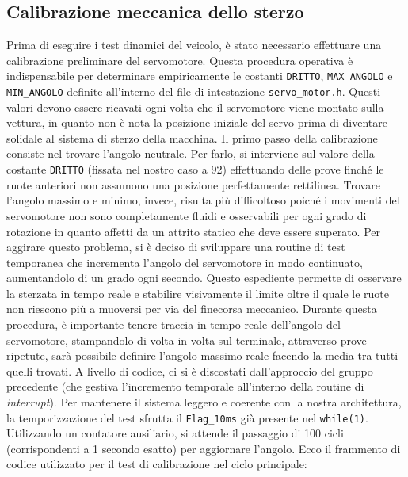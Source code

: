 \documentclass[11pt]{report}
\begin{document}
\subsection{Calibrazione meccanica dello sterzo}
Prima di eseguire i test dinamici del veicolo, è stato necessario effettuare una calibrazione preliminare del servomotore. Questa procedura operativa è indispensabile per determinare empiricamente le costanti \verb|DRITTO|, \verb|MAX_ANGOLO| e \verb|MIN_ANGOLO| definite all'interno del file di intestazione \verb|servo_motor.h|. Questi valori devono essere ricavati ogni volta che il servomotore viene montato sulla vettura, in quanto non è nota la posizione iniziale del servo prima di diventare solidale al sistema di sterzo della macchina. 
Il primo passo della calibrazione consiste nel trovare l'angolo neutrale. Per farlo, si interviene sul valore della costante \verb|DRITTO| (fissata nel nostro caso a 92) effettuando delle prove finché le ruote anteriori non assumono una posizione perfettamente rettilinea.
Trovare l'angolo massimo e minimo, invece, risulta più difficoltoso poiché i movimenti del servomotore non sono completamente fluidi e osservabili per ogni grado di rotazione in quanto affetti da un attrito statico che deve essere superato. Per aggirare questo problema, si è deciso di sviluppare una routine di test temporanea che incrementa l'angolo del servomotore in modo continuato, aumentandolo di un grado ogni secondo. Questo espediente permette di osservare la sterzata in tempo reale e stabilire visivamente il limite oltre il quale le ruote non riescono più a muoversi per via del finecorsa meccanico.
Durante questa procedura, è importante tenere traccia in tempo reale dell'angolo del servomotore, stampandolo di volta in volta sul terminale, attraverso prove ripetute, sarà possibile definire l'angolo massimo reale facendo la media tra tutti quelli trovati.
A livello di codice, ci si è discostati dall'approccio del gruppo precedente (che gestiva l'incremento temporale all'interno della routine di \textit{interrupt}). Per mantenere il sistema leggero e coerente con la nostra architettura, la temporizzazione del test sfrutta il \verb|Flag_10ms| già presente nel \verb|while(1)|. Utilizzando un contatore ausiliario, si attende il passaggio di 100 cicli (corrispondenti a 1 secondo esatto) per aggiornare l'angolo.
Ecco il frammento di codice utilizzato per il test di calibrazione nel ciclo principale:
\end{document}
